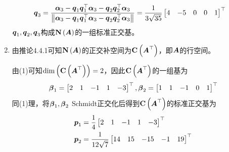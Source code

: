 \documentclass{beamer}
\begin{document}
\begin{frame}[allowframebreaks]
\begin{enumerate}
{\begin{align*}
                  \boldsymbol{q}_3 & =\frac{\boldsymbol{\alpha}_3-\boldsymbol{q}_1\boldsymbol{q}_1^\top\boldsymbol{\alpha}_3-\boldsymbol{q}_2\boldsymbol{q}_2^\top\boldsymbol{\alpha}_3}{\left\Vert\boldsymbol{\alpha}_3-\boldsymbol{q}_1\boldsymbol{q}_1^\top\boldsymbol{\alpha}_3-\boldsymbol{q}_2\boldsymbol{q}_2^\top\boldsymbol{\alpha}_3\right\Vert}=\frac{1}{3\sqrt{35}}\begin{bmatrix}4&-5&0&0&1\end{bmatrix}^\top
              \end{align*}
              \(\boldsymbol{q}_1,\boldsymbol{q}_2,\boldsymbol{q}_3\)构成\(\boldsymbol{\mathrm{N}}\left( \boldsymbol{A} \right)\)的一组标准正交基。
              }
        \item {
              由推论4.4.1可知\(\boldsymbol{\mathrm{N}}\left( \boldsymbol{A} \right)\)的正交补空间为\(\boldsymbol{\mathrm{C}}\left( \boldsymbol{A}^\top \right)\)，即\(\boldsymbol{A}\)的行空间。

              由(1)可知\(\dim\left( \boldsymbol{\mathrm{C}}\left( \boldsymbol{A}^\top \right) \right)=2\)，因此\(\boldsymbol{\mathrm{C}}\left( \boldsymbol{A}^\top \right)\)的一组基为
              \begin{equation*}
                  \boldsymbol{\beta}_1=\begin{bmatrix}2&1&-1&1&-3\end{bmatrix}^\top,
                  \boldsymbol{\beta}_2=\begin{bmatrix}1&1&-1&0&1\end{bmatrix}^\top
              \end{equation*}
              同(1)理，将\(\boldsymbol{\beta}_1,\boldsymbol{\beta}_2\) Schmidt正交化后得到\(\boldsymbol{\mathrm{C}}\left( \boldsymbol{A}^\top \right)\)的标准正交基为
              \begin{align*}
                  \boldsymbol{p}_1 & =\frac{1}{4}\begin{bmatrix}2&1&-1&1&-3\end{bmatrix}^\top              \\
                  \boldsymbol{p}_2 & =\frac{1}{12\sqrt{7}}\begin{bmatrix}14&15&-15&-1&19\end{bmatrix}^\top
              \end{align*}
              }
    \end{enumerate}
\end{frame}
\end{document}
